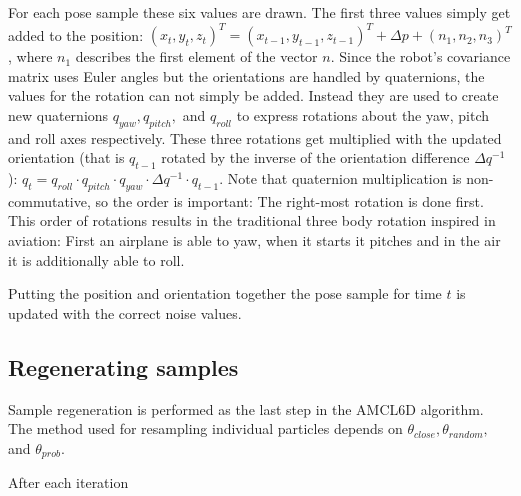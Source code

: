 \documentclass[Thesis.tex]{subfiles}
\begin{document}
For each pose sample these six values are drawn. The first three values simply get added to the position: $(x_t, y_t, z_t)^T = (x_{t-1}, y_{t-1}, z_{t-1})^T + \Delta p + (n_1, n_2, n_3)^T$, where $n_1$ describes the first element of the vector $n$.
Since the robot's covariance matrix uses Euler angles but the orientations are handled by quaternions, the values for the rotation can not simply be added. Instead they are used to create new quaternions $q_{yaw}, q_{pitch},$ and $q_{roll}$ to express rotations about the yaw, pitch and roll axes respectively. These three rotations get multiplied with the updated orientation (that is $q_{t-1}$ rotated by the inverse of the orientation difference $\Delta q^{-1}$): $q_{t} = q_{roll} \cdot q_{pitch} \cdot q_{yaw} \cdot \Delta q^{-1} \cdot q_{t-1}$. Note that quaternion multiplication is non-commutative, so the order is important: The right-most rotation is done first. This order of rotations results in the traditional three body rotation inspired in aviation: First an airplane is able to yaw, when it starts it pitches and in the air it is additionally able to roll.

Putting the position and orientation together the pose sample for time $t$ is updated with the correct noise values.

\subsection{Regenerating samples}
Sample regeneration is performed as the last step in the \gls{AMCL6D} algorithm. The method used for resampling individual particles depends on $\theta_{close}, \theta_{random},$ and $\theta_{prob}$.

After each iteration 
\end{document}
